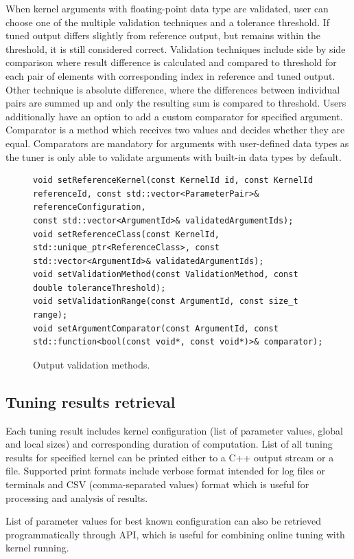 \documentclass
[
    digital, %
    oneside, %
    table, %
    nolof, %
    nolot, %
    nocover %
]{fithesis3}
\begin{document}
When kernel arguments with floating-point data type are validated, user can choose one of the multiple validation techniques and a tolerance threshold.
If tuned output differs slightly from reference output, but remains within the threshold, it is still considered correct. Validation techniques include
side by side comparison where result difference is calculated and compared to threshold for each pair of elements with corresponding index in reference
and tuned output. Other technique is absolute difference, where the differences between individual pairs are summed up and only the resulting sum is
compared to threshold. Users additionally have an option to add a custom comparator for specified argument. Comparator is a method which receives two
values and decides whether they are equal. Comparators are mandatory for arguments with user-defined data types as the tuner is only able to validate
arguments with built-in data types by default.

\begin{figure}
\begin{lstlisting}
void setReferenceKernel(const KernelId id, const KernelId referenceId, const std::vector<ParameterPair>& referenceConfiguration,
const std::vector<ArgumentId>& validatedArgumentIds);
void setReferenceClass(const KernelId, std::unique_ptr<ReferenceClass>, const std::vector<ArgumentId>& validatedArgumentIds);
void setValidationMethod(const ValidationMethod, const double toleranceThreshold);
void setValidationRange(const ArgumentId, const size_t range);
void setArgumentComparator(const ArgumentId, const std::function<bool(const void*, const void*)>& comparator);
\end{lstlisting}
\caption{Output validation methods.}
\label{ktt-validation-methods}
\end{figure}

\subsection{Tuning results retrieval}
Each tuning result includes kernel configuration (list of parameter values, global and local sizes) and corresponding duration of computation. List of
all tuning results for specified kernel can be printed either to a C++ output stream or a file. Supported print formats include verbose format intended
for log files or terminals and CSV (comma-separated values) format which is useful for processing and analysis of results.

List of parameter values for best known configuration can also be retrieved programmatically through API, which is useful for combining online tuning
with kernel running.
\end{document}
